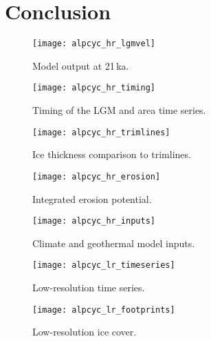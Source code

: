 \documentclass{article}
\begin{document}
\section{Conclusion}






    \begin{figure}
      \centerline{\texttt{[image: alpcyc\_hr\_lgmvel]}}
      \caption{Model output at 21\,ka.}
      \label{fig:lgmvel}
    \end{figure}

    \begin{figure}
      \centerline{\texttt{[image: alpcyc\_hr\_timing]}}
      \caption{Timing of the LGM and area time series.}
      \label{fig:timing}
    \end{figure}

    \begin{figure}
      \centerline{\texttt{[image: alpcyc\_hr\_trimlines]}}
      \caption{Ice thickness comparison to trimlines.}
      \label{fig:trimlines}
    \end{figure}

    \begin{figure}
      \centerline{\texttt{[image: alpcyc\_hr\_erosion]}}
      \caption{Integrated erosion potential.}
      \label{fig:erosion}
    \end{figure}

\setcounter{table}{0}
\renewcommand{\thetable}{S\arabic{table}}%

\setcounter{figure}{0}
\renewcommand{\thefigure}{S\arabic{figure}}%

    \begin{figure}
      \centerline{\texttt{[image: alpcyc\_hr\_inputs]}}
      \caption{Climate and geothermal model inputs.}
      \label{fig:inputs}
    \end{figure}

    \begin{figure}
      \centerline{\texttt{[image: alpcyc\_lr\_timeseries]}}
      \caption{Low-resolution time series.}
      \label{fig:timeseries}
    \end{figure}

    \begin{figure}
      \centerline{\texttt{[image: alpcyc\_lr\_footprints]}}
      \caption{Low-resolution ice cover.}
      \label{fig:footprints}
    \end{figure}

\end{document}
